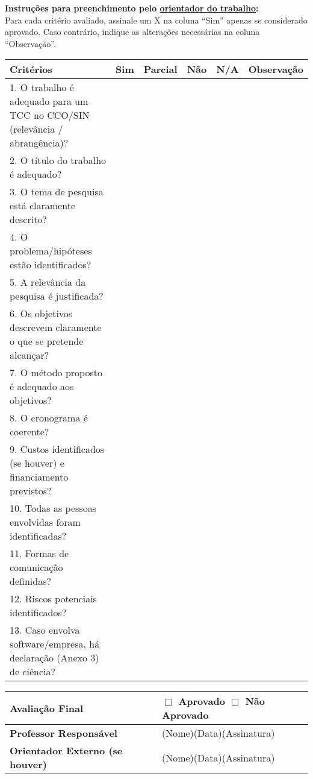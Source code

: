 \small
\noindent
\textbf{Instruções para preenchimento pelo \underline{orientador do trabalho}:}\\
Para cada critério avaliado, assinale um X na coluna “Sim” apenas se considerado aprovado.
Caso contrário, indique as alterações necessárias na coluna “Observação”.

\vspace{0.5cm}
\begin{tabularx}{\textwidth}{|p{}|
                                >{\centering\arraybackslash}p{}|
                                >{\centering\arraybackslash}p{}|
                                >{\centering\arraybackslash}p{}|
                                >{\centering\arraybackslash}p{}|
                                X|}
  \hline
  \textbf{Critérios} & \textbf{Sim} & \textbf{Parcial} & \textbf{Não} & \textbf{N/A} & \textbf{Observação} \\
  \hline
  1. O trabalho é adequado para um TCC no CCO/SIN (relevância / abrangência)? & & & & & \\
  \hline
  2. O título do trabalho é adequado? & & & & & \\
  \hline
  3. O tema de pesquisa está claramente descrito? & & & & & \\
  \hline
  4. O problema/hipóteses estão identificados? & & & & & \\
  \hline
  5. A relevância da pesquisa é justificada? & & & & & \\
  \hline
  6. Os objetivos descrevem claramente o que se pretende alcançar? & & & & & \\
  \hline
  7. O método proposto é adequado aos objetivos? & & & & & \\
  \hline
  8. O cronograma é coerente? & & & & & \\
  \hline
  9. Custos identificados (se houver) e financiamento previstos? & & & & & \\
  \hline
  10. Todas as pessoas envolvidas foram identificadas? & & & & & \\
  \hline
  11. Formas de comunicação definidas? & & & & & \\
  \hline
  12. Riscos potenciais identificados? & & & & & \\
  \hline
  13. Caso envolva software/empresa, há declaração (Anexo 3) de ciência? & & & & & \\
  \hline
\end{tabularx}

\vspace{1cm}

\noindent
\begin{tabularx}{\textwidth}{|X|X|}
  \hline
  \textbf{Avaliação Final} & $\Box$ Aprovado \quad\quad $\Box$ Não Aprovado \\
  \hline
  \textbf{Professor Responsável} & (Nome)\hfill(Data)\hfill(Assinatura) \\
  \hline
  \textbf{Orientador Externo (se houver)} & (Nome)\hfill(Data)\hfill(Assinatura) \\
  \hline
\end{tabularx}
